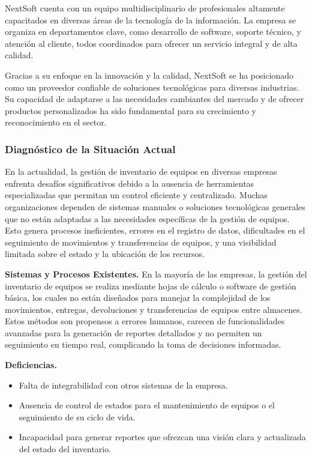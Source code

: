 \documentclass[stu, 12pt, letterpaper, donotrepeattitle, floatsintext, natbib]{apa7}
\begin{document}
NextSoft cuenta con un equipo multidisciplinario de profesionales altamente capacitados en diversas áreas de la tecnología de la información.
La empresa se organiza en departamentos clave, como desarrollo de software, soporte técnico, y atención al cliente, todos coordinados para
ofrecer un servicio integral y de alta calidad.

Gracias a su enfoque en la innovación y la calidad, NextSoft se ha posicionado como un proveedor confiable de soluciones tecnológicas para
diversas industrias. Su capacidad de adaptarse a las necesidades cambiantes del mercado y de ofrecer productos personalizados ha sido
fundamental para su crecimiento y reconocimiento en el sector.

\subsubsection{Diagnóstico de la Situación Actual}
En la actualidad, la gestión de inventario de equipos en diversas empresas enfrenta desafíos significativos debido a la ausencia de
herramientas especializadas que permitan un control eficiente y centralizado. Muchas organizaciones dependen de sistemas manuales o soluciones
tecnológicas generales que no están adaptadas a las necesidades específicas de la gestión de equipos. Esto genera procesos ineficientes,
errores en el registro de datos, dificultades en el seguimiento de movimientos y transferencias de equipos, y una visibilidad limitada sobre
el estado y la ubicación de los recursos.

\textbf{Sistemas y Procesos Existentes. }En la mayoría de las empresas, la gestión del inventario de equipos se realiza mediante hojas de
cálculo o software de gestión básica, los cuales no están diseñados para manejar la complejidad de los movimientos, entregas, devoluciones y
transferencias de equipos entre almacenes. Estos métodos son propensos a errores humanos, carecen de funcionalidades avanzadas para la
generación de reportes detallados y no permiten un seguimiento en tiempo real, complicando la toma de decisiones informadas.

\textbf{Deficiencias. }
\begin{itemize}
    \item Falta de integrabilidad con otros sistemas de la empresa.
    \item Ausencia de control de estados para el mantenimiento de equipos o el seguimiento de su ciclo de vida.
    \item Incapacidad para generar reportes que ofrezcan una visión clara y actualizada del estado del inventario.
\end{itemize}
\end{document}
